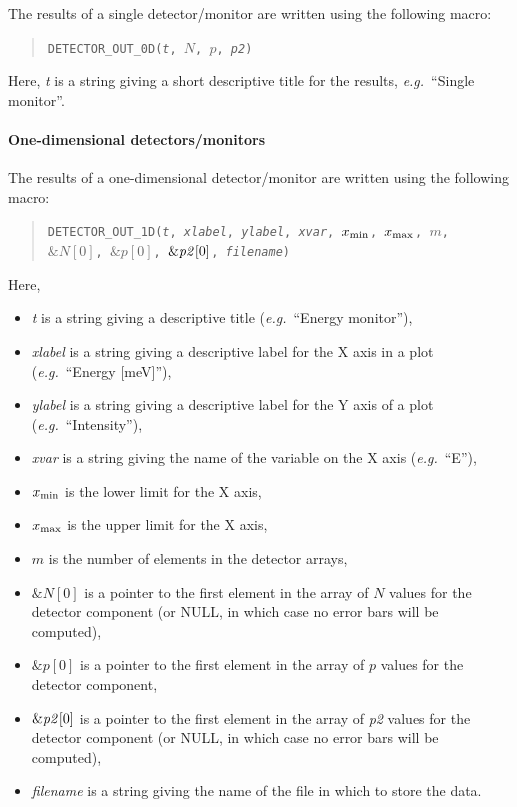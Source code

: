 The results of a single detector/monitor are written using the following
macro:
\begin{quote}
  \texttt{DETECTOR\_OUT\_0D({\it t}, $N$, $p$, {\it p2})}
\end{quote}
Here, \textit{t} is a string giving a short descriptive title for the
results, {\em e.g.}\ ``Single monitor''.


\paragraph{One-dimensional detectors/monitors}

The results of a one-dimensional detector/\discretionary{}{}{}mon\-i\-tor are written using the
following macro:
\begin{quote}
  \texttt{DETECTOR\_OUT\_1D({\it t},
        {\it xlabel},
        {\it ylabel},
        {\it xvar}, $x_{\rm min}$, $x_{\rm max}$, $m$, \\
          $\&N[0]$, $\&p[0]$, $\&{\it p2}[0]$,
        {\it filename})}
\end{quote}
Here,
\begin{itemize}
\item \textit{t} is a string giving a descriptive title ({\em e.g.}\ ``Energy
  monitor''),
\item \textit{xlabel} is a string giving a descriptive label for the X
  axis in a plot ({\em e.g.}\ ``Energy [meV]''),
\item \textit{ylabel} is a string giving a descriptive label for the Y
  axis of a plot ({\em e.g.}\ ``Intensity''),
\item \textit{xvar} is a string giving the name of the variable on the X
  axis ({\em e.g.}\ ``E''),
\item $x_{\rm min}$ is the lower limit for the X axis,
\item $x_{\rm max}$ is the upper limit for the X axis,
\item $m$ is the number of elements in the detector arrays,
\item $\&N[0]$ is a pointer to the first element in the array of $N$
  values for the detector component (or NULL, in which case no error
  bars will be computed),
\item $\&p[0]$ is a pointer to the first element in the array of $p$
  values for the detector component,
\item $\&{\it p2}[0]$ is a pointer to the first element in the array of
  {\it p2} values for the detector component (or NULL, in which case no error
  bars will be computed),
\item \textit{filename} is a string giving the name of the file in which
  to store the data.
\end{itemize}


